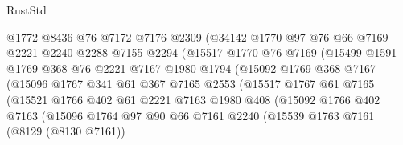 \begin{lexlean}{RustStd}
\begin{coremodule}
{\begin{coremodule}
{{{{{{{{{{{{{{{{{{{{{{{{{{{{{{{{{{{{{{{{{{{{{{{{{{{{{                        @1772
                        @8436
                        @76
                        @7172
                        @7176
                        @2309
                        (@34142
                          @1770
                          @97
                          @76
                          @66
                          @7169
                          @2221
                          @2240
                          @2288
                          @7155
                          @2294
                          (@15517
                            @1770
                            @76
                            @7169
                            (@15499
                              @1591
                              @1769
                              @368
                              @76
                              @2221
                              @7167
                              @1980
                              @1794
                              (@15092
                                @1769
                                @368
                                @7167
                                (@15096
                                  @1767
                                  @341
                                  @61
                                  @367
                                  @7165
                                  @2553
                                  (@15517
                                    @1767
                                    @61
                                    @7165
                                    (@15521
                                      @1766
                                      @402
                                      @61
                                      @2221
                                      @7163
                                      @1980
                                      @408
                                      (@15092
                                        @1766
                                        @402
                                        @7163
                                        (@15096
                                          @1764
                                          @97
                                          @90
                                          @66
                                          @7161
                                          @2240
                                          (@15539
                                            @1763
                                            @7161
                                            (@8129 (@8130 @7161))
}}}}}}}}}}}}}}}}}}}}}}}}}}}}}}}}}}}}}}}}}}}}}}}}}}}}}
\end{coremodule}}
\end{coremodule}
\end{lexlean}
